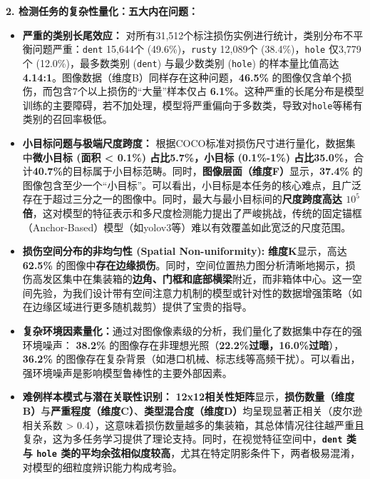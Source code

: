\documentclass[
]{article}
\begin{document}
\textbf{2. 检测任务的复杂性量化：五大内在问题：}

\begin{itemize}
\item
  \textbf{严重的类别长尾效应：}
  对所有31,512个标注损伤实例进行统计，类别分布不平衡问题严重：\texttt{dent}
  15,644个 (49.6\%)，\texttt{rusty} 12,089个 (38.4\%)，\texttt{hole}
  仅3,779个 (12.0\%)，最多数类别 (\texttt{dent}) 与最少数类别
  (\texttt{hole})
  的样本量比值高达\textbf{4.14:1}。图像数据（维度B）同样存在这种问题，\textbf{46.5\%}
  的图像仅含单个损伤，而包含7个以上损伤的``大量''样本仅占
  \textbf{6.1\%}。这种严重的长尾分布是模型训练的主要障碍，若不加处理，模型将严重偏向于多数类，导致对\texttt{hole}等稀有类别的召回率极低。
\item
  \textbf{小目标问题与极端尺度跨度：}
  根据COCO标准对损伤尺寸进行量化，数据集中\textbf{微小目标 (面积
  \textless{} 0.1\%) 占比5.7\%，小目标 (0.1\%-1\%)
  占比35.0\%}，合计\textbf{40.7\%}的目标属于小目标范畴。同时，\textbf{图像层面（维度F）}显示，\textbf{37.4\%}
  的图像包含至少一个``小目标''。可以看出，小目标是本任务的核心难点，且广泛存在于超过三分之一的图像中。同时，最大与最小目标间的\textbf{尺度跨度高达
  \(10^5\)
  倍}，这对模型的特征表示和多尺度检测能力提出了严峻挑战，传统的固定锚框（Anchor-Based）模型（如yolov3等）难以有效覆盖如此宽泛的尺度范围。
\item
  \textbf{损伤空间分布的非均匀性 (Spatial Non-uniformity):}
  \textbf{维度K}显示，高达 \textbf{62.5\%}
  的图像中\textbf{存在边缘损伤}。同时，空间位置热力图分析清晰地揭示，损伤高发区集中在集装箱的\textbf{边角、门框和底部横梁}附近，而非箱体中心。这一空间先验，为我们设计带有空间注意力机制的模型或针对性的数据增强策略（如在边缘区域进行更多随机裁剪）提供了宝贵的指导。
\item
  \textbf{复杂环境因素量化：}通过对图像像素级的分析，我们量化了数据集中存在的强环境噪声：
  \textbf{38.2\%}
  的图像存在非理想光照（\textbf{22.2\%过曝，16.0\%过暗}），\textbf{36.2\%}
  的图像存在复杂背景（如港口机械、标志线等高频干扰）。可以看出，强环境噪声是影响模型鲁棒性的主要外部因素。
\item
  \textbf{难例样本模式与潜在关联性识别：}
  \textbf{12x12相关性矩阵}显示，\textbf{损伤数量（维度B）}与\textbf{严重程度（维度C）}、\textbf{类型混合度（维度D）}均呈现显著正相关（皮尔逊相关系数
  \textgreater{}
  0.4），这意味着损伤数量越多的集装箱，其总体情况往往越严重且复杂，这为多任务学习提供了理论支持。同时，在视觉特征空间中，\textbf{\texttt{dent}
  类与 \texttt{hole}
  类的平均余弦相似度较高}，尤其在特定阴影条件下，两者极易混淆，对模型的细粒度辨识能力构成考验。
\end{itemize}
\end{document}
